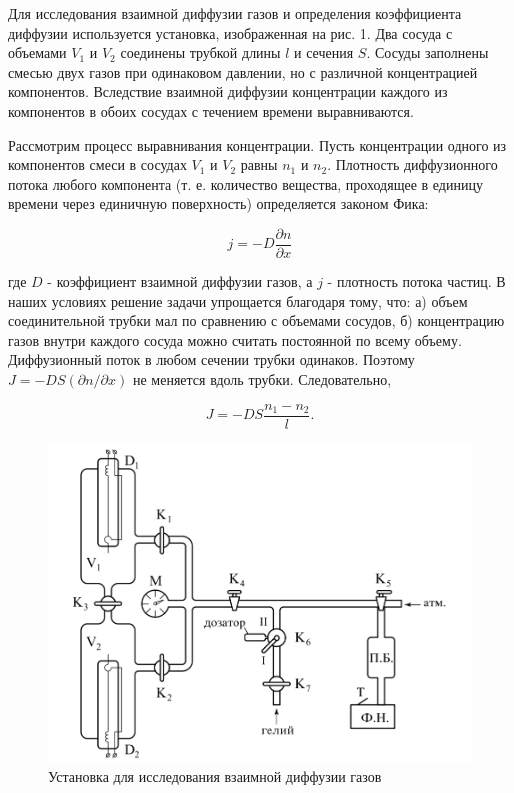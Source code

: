\documentclass[a4paper,12pt]{article} %
\begin{document}
	
Для исследования взаимной диффузии газов и определения коэффициента диффузии используется установка, изображенная на рис. 1. Два сосуда с объемами $V_{1}$ и $V_{2}$ соединены трубкой длины $l$ и сечения $S$. Сосуды заполнены смесью двух газов при одинаковом давлении, но с различной концентрацией компонентов. Вследствие взаимной диффузии концентрации каждого из компонентов в обоих сосудах с течением времени выравниваются.


Рассмотрим процесс выравнивания концентрации. Пусть концентрации одного из компонентов смеси в сосудах $V_{1}$ и $V_{2}$ равны $n_{1}$ и $n_{2}$. Плотность диффузионного потока любого компонента (т. е. количество вещества, проходящее в единицу времени через единичную поверхность) определяется законом Фика:


\begin{equation}
	j = -D \frac{\partial n}{\partial x}
\end{equation}

где $D$ - коэффициент взаимной диффузии газов, а $j$ - плотность потока частиц. В наших условиях решение задачи упрощается благодаря тому, что: а) объем соединительной трубки мал по сравнению с объемами сосудов, б) концентрацию газов внутри каждого сосуда можно считать постоянной по всему объему. Диффузионный поток в любом сечении трубки одинаков. Поэтому $J = -DS(\partial n/\partial x)$ не меняется вдоль трубки. Следовательно,


\begin{equation}
	J = - DS\frac{n_{1} - n_{2}}{l}.
\end{equation}

\newpage

\begin{figure}[h!]
	\centering
	\includegraphics[scale=0.8]{Pictures/Рис1.png}
	\caption{Установка для исследования взаимной диффузии газов}
\end{figure}
\end{document}
